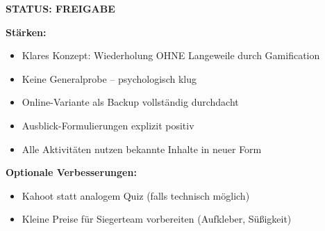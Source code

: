 \documentclass[11pt,a4paper]{article}
\begin{document}
\begin{scorebox}
\vspace{1em}
\textcolor{successgreen}{\textbf{STATUS: FREIGABE}}

\vspace{1em}
\textbf{Stärken:}
\begin{itemize}
    \item Klares Konzept: Wiederholung OHNE Langeweile durch Gamification
    \item Keine Generalprobe -- psychologisch klug
    \item Online-Variante als Backup vollständig durchdacht
    \item Ausblick-Formulierungen explizit positiv
    \item Alle Aktivitäten nutzen bekannte Inhalte in neuer Form
\end{itemize}

\textbf{Optionale Verbesserungen:}
\begin{itemize}
    \item Kahoot statt analogem Quiz (falls technisch möglich)
    \item Kleine Preise für Siegerteam vorbereiten (Aufkleber, Süßigkeit)
\end{itemize}

\end{scorebox}
\end{document}

